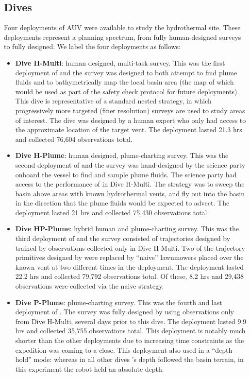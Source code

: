 \subsection{Dives}
\label{sec:field_dives}
Four deployments of AUV \Sentry were available to study the hydrothermal site. These deployments represent a planning spectrum, from fully human-designed surveys to fully \PHORTEX designed. We label the four deployments as follows:
\begin{itemize}
    \item \textbf{Dive H-Multi}: human designed, multi-task survey. This was the first deployment of \Sentry and the survey was designed to both attempt to find plume fluids and to bathymetrically map the local basin area (the map of which would be used as part of the safety check protocol for future deployments). This dive is representative of a standard nested strategy, in which progressively more targeted (finer resolution) surveys are used to study areas of interest. The dive was designed by a human expert who only had access to the approximate location of the target vent. The deployment lasted 21.3 hrs and collected 76,604 observations total.
    \item \textbf{Dive H-Plume}: human designed, plume-charting survey. This was the second deployment of \Sentry and the survey was hand-designed by the science party onboard the vessel to find and sample plume fluids. The science party had access to the performance of \Sentry in Dive H-Multi. The strategy was to sweep the basin above areas with known hydrothermal vents, and fly out into the basin in the direction that the plume fluids would be expected to advect. The deployment lasted 21 hrs and collected 75,430 observations total.
    \item \textbf{Dive HP-Plume}: hybrid human and \PHORTEX plume-charting survey. This was the third deployment of \Sentry and the survey consisted of trajectories designed by \PHORTEX trained by observations collected only in Dive H-Multi. Two of the trajectory primitives designed by \PHORTEX were replaced by ``naive'' lawnmowers placed over the known vent at two different times in the deployment. The deployment lasted 22.2 hrs and collected 79,792 observations total. Of these, 8.2 hrs and 29,438 observations were collected via the naive strategy.
    \item \textbf{Dive P-Plume}: \PHORTEX plume-charting survey. This was the fourth and last deployment of \Sentry. The survey was fully designed by \PHORTEX using observations only from Dive H-Multi, several days prior to this dive. The deployment lasted 9.9 hrs and collected 35,755 observations total. This deployment is notably much shorter than the other deployments due to increasing time constraints as the expedition was coming to a close. This deployment also used \Sentry in a ``depth-hold'' mode: whereas in all other dives \Sentry's depth followed the basin terrain, in this experiment the robot held an absolute depth.
\end{itemize}

